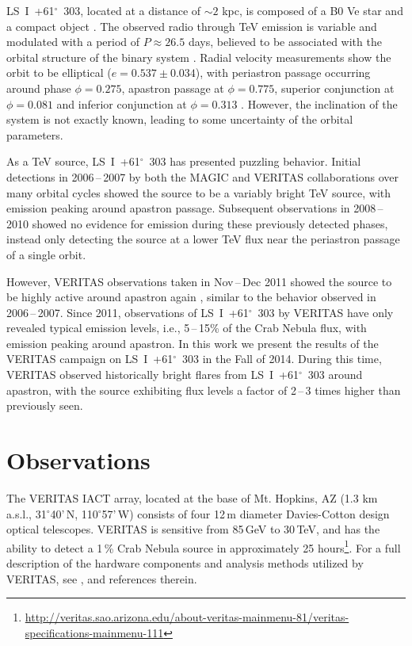 \documentclass[preprint2]{aastex}
\newcommand{\lsi}{LS~I~+61$^{\circ}$~303}
\newcommand{\gev}{\,GeV}
\newcommand{\tev}{\,TeV}
\begin{document}
\lsi{}, located at a distance of $\sim2$ kpc, is composed of a B0 Ve star and a compact object \citep{HandC1981, Casares2005}. The observed radio through TeV emission is variable and modulated with a period of $P \approx 26.5$ days, believed to be associated with the orbital structure of the binary system \citep{Albert2006, Esposito2007, VERITASLSIDetection, Abdo2009, LiXray, 2015A&A...575L...9M}. Radial velocity measurements show the orbit to be elliptical ($e = 0.537\pm0.034$), with periastron passage occurring around phase $\phi=0.275$, apastron passage at $\phi=0.775$, superior conjunction at $\phi=0.081$ and inferior conjunction at $\phi=0.313$ \citep{Aragona2009}. However, the inclination of the system is not exactly known, leading to some uncertainty of the orbital parameters.

As a TeV source, \lsi{} has presented puzzling behavior. Initial detections in 2006\,--\,2007 by both the MAGIC \citep{Albert2006} and VERITAS \citep{VERITASLSIDetection} collaborations over many orbital cycles showed the source to be a variably bright TeV source, with emission peaking around apastron passage. Subsequent observations in 2008\,--\,2010 \citep{2011ApJ...738....3A} showed no evidence for emission during these previously detected phases, instead only detecting the source at a lower TeV flux near the periastron passage of a single orbit. 

However, VERITAS observations taken in Nov\,--\,Dec 2011 showed the source to be highly active around apastron again \citep{2013ApJ...779...88A}, similar to the behavior observed in 2006\,--\,2007. Since 2011, observations of \lsi{} by VERITAS have only revealed typical emission levels, i.e., 5\,--\,15\% of the Crab Nebula flux, with emission peaking around apastron. In this work we present the results of the VERITAS campaign on \lsi{} in the Fall of 2014. During this time, VERITAS observed historically bright flares from \lsi{} around apastron, with the source exhibiting flux levels a factor of 2\,--\,3 times higher than previously seen.

\section{Observations}
The VERITAS IACT array, located at the base of Mt. Hopkins, AZ (1.3 km a.s.l., 31$^{\circ}$40'\,N, 110$^{\circ}$57'\,W) consists of four 12\,m diameter Davies-Cotton design optical telescopes. VERITAS is sensitive from 85\gev{} to 30\tev{}, and has the ability to detect a 1\,\% Crab Nebula source in approximately 25 hours\footnote{\url{http://veritas.sao.arizona.edu/about-veritas-mainmenu-81/veritas-specifications-mainmenu-111}}. For a full description of the hardware components and analysis methods utilized by VERITAS, see \citet{VERITAS, KiedaVTSUpgrade, VERITASLSIDetection}, and references therein.
\end{document}
